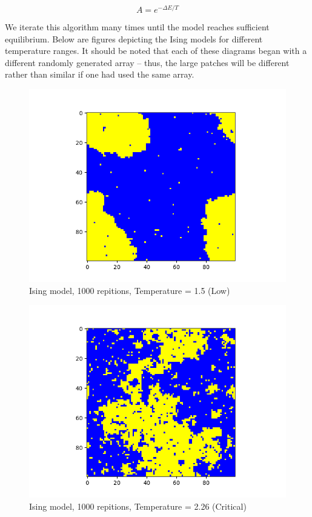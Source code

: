 \documentclass[12pt]{article}
\begin{document}
\begin{equation}
A = e^{-\Delta E / T}
\end{equation}

We iterate this algorithm many times until the model reaches sufficient equilibrium. Below are figures depicting the Ising models for different temperature ranges. It should be noted that each of these diagrams began with a different randomly generated array -- thus, the large patches will be different rather than similar if one had used the same array.

\begin{figure}[H]
\begin{center}
\includegraphics[scale=0.6]{low_temp.png}
\caption{Ising model, 1000 repitions, Temperature = 1.5 (Low)}
\end{center}
\end{figure}

\begin{figure}[H]
\begin{center}
\includegraphics[scale=0.6]{crit_temp.png}
\caption{Ising model, 1000 repitions, Temperature = 2.26 (Critical)}
\end{center}
\end{figure}
\end{document}
